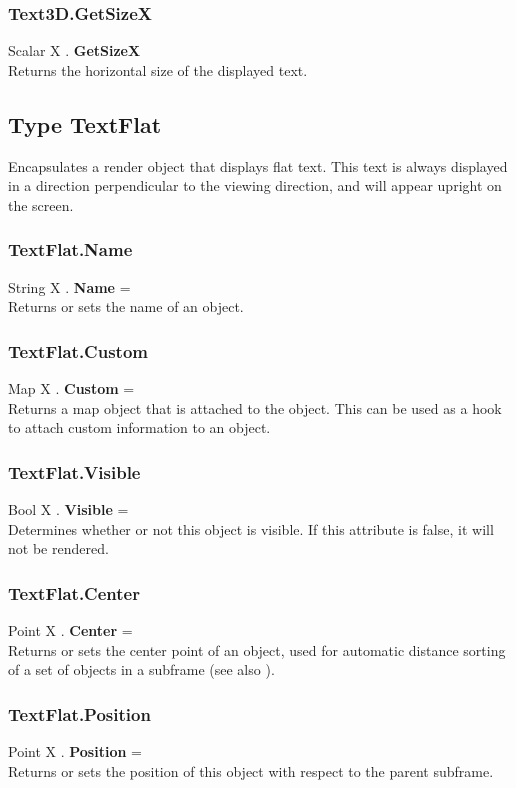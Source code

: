 \subsubsection{Text3D.GetSizeX \label{F:Text3D:GetSizeX}}
Scalar X . \textbf{GetSizeX} \\
Returns the horizontal size of the displayed text.

\subsection{Type TextFlat \label{T:TextFlat}}
Encapsulates a render object that displays flat text. This text is always displayed in a direction perpendicular to the viewing direction, and will appear upright on the screen.

\subsubsection{TextFlat.Name \label{F:TextFlat:Name}}
String X . \textbf{Name} = \\
Returns or sets the name of an object.

\subsubsection{TextFlat.Custom \label{F:TextFlat:Custom}}
Map X . \textbf{Custom} = \\
Returns a map object that is attached to the object. This can be used as a hook to attach custom information to an object.


\subsubsection{TextFlat.Visible \label{F:TextFlat:Visible}}
Bool X . \textbf{Visible} = \\
Determines whether or not this object is visible. If this attribute is false, it will not be rendered.

\subsubsection{TextFlat.Center \label{F:TextFlat:Center}}
Point X . \textbf{Center} = \\
Returns or sets the center point of an object, used for automatic distance sorting of a set of objects in a subframe (see also ).

\subsubsection{TextFlat.Position \label{F:TextFlat:Position}}
Point X . \textbf{Position} = \\
Returns or sets the position of this object with respect to the parent subframe.

